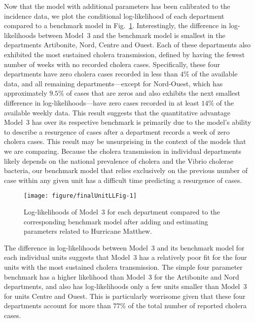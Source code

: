 Now that the model with additional parameters has been calibrated to the incidence data, we plot the conditional log-likelihood of each department compared to a benchmark model in Fig.~\ref{fig:finalUnitLL}.
Interestingly, the difference in log-likelihoods between Model~3 and the benchmark model is smallest in the departments Artibonite, Nord, Centre and Ouest.
Each of these departments also exhibited the most sustained cholera transmission, defined by having the fewest number of weeks with no recorded cholera cases.
Specifically, these four departments have zero cholera cases recorded in less than $4\%$ of the available data, and all remaining departments---except for Nord-Ouest, which has approximately $9.5\%$ of cases that are zeros and also exhibits the next smallest difference in log-likelihoods---have zero cases recorded in at least $14\%$ of the available weekly data.
This result suggests that the quantitative advantage Model~3 has over its respective benchmark is primarily due to the model's ability to describe a resurgence of cases after a department records a week of zero cholera cases.
This result may be unsurprising in the context of the models that we are comparing.
Because the cholera transmission in individual departments likely depends on the national prevalence of cholera and the Vibrio cholerae bacteria, our benchmark model that relies exclusively on the previous number of case within any given unit has a difficult time predicting a resurgence of cases.

\begin{figure}[!ht]
\begin{knitrout}
\color{fgcolor}

{\centering \texttt{[image: figure/finalUnitLLFig-1]} 

}


\end{knitrout}
\caption{\label{fig:finalUnitLL}Log-likelihoods of Model~3 for each department compared to the corresponding benchmark model after adding and estimating parameters related to Hurricane Matthew.}
\end{figure}

The difference in log-likelihoods between Model~3 and its benchmark model for each individual units suggests that Model~3 has a relatively poor fit for the four units with the most sustained cholera transmission.
The simple four parameter benchmark has a higher likelihood than Model~3 for the Artibonite and Nord departments, and also has log-likelihoods only a few units smaller than Model~3 for units Centre and Ouest.
This is particularly worrisome given that these four departments account for more than $77\%$ of the total number of reported cholera cases.

